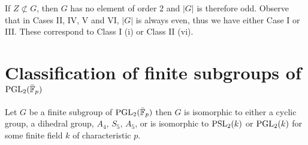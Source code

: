 \begin{lemma}
    If $Z \not \subset G$, then $G$ has no element of order 2 and $|G|$ is therefore odd. Observe that in Cases II, IV, V and VI, $|G|$ is always even, thus we have either Case I or III. These correspond to Class I (i) or Class II (vi). \\
\end{lemma}

\section{Classification of finite subgroups of $\operatorname{PGL}_2(\bar{\mathbb{F}}_p)$}

\begin{theorem}
    \label{FLT_classification_fin_subgroups_of_PGL2_over_AlgClosure_ZMod}
    Let $G$ be a finite subgroup of $\operatorname{PGL}_2(\bar{\mathbb{F}}_p)$ then $G$ is isomorphic to either a cyclic group, a dihedral group, $A_4$, $S_5$, $A_5$, or is isomorphic to $\operatorname{PSL}_2(k)$ or $\operatorname{PGL}_2(k)$ for some finite field $k$ of characteristic $p$.
\end{theorem}
